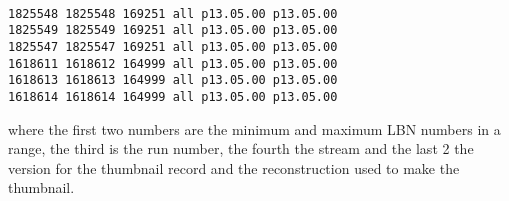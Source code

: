 \documentclass[12pt]{article}
\begin{document}
\begin{verbatim}

1825548 1825548 169251 all p13.05.00 p13.05.00
1825549 1825549 169251 all p13.05.00 p13.05.00
1825547 1825547 169251 all p13.05.00 p13.05.00
1618611 1618612 164999 all p13.05.00 p13.05.00
1618613 1618613 164999 all p13.05.00 p13.05.00
1618614 1618614 164999 all p13.05.00 p13.05.00
\end{verbatim}

where the first two numbers are the minimum and maximum LBN numbers in a range,
the third is the run number, the fourth the stream and the last 2 the version
for the thumbnail record and the reconstruction used to make the thumbnail.

%
%


\end{document}
